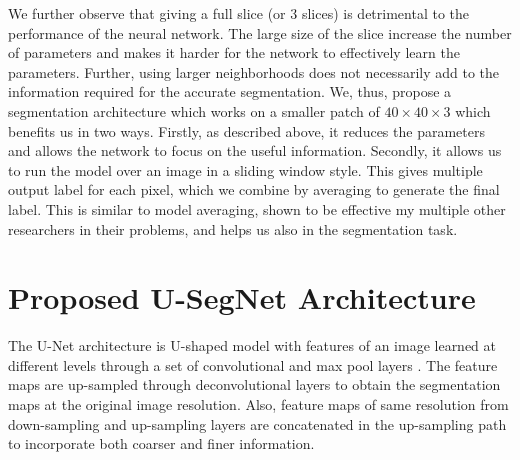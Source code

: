 \documentclass{article}
\begin{document}
We further observe that giving a full slice (or 3 slices) is detrimental to the performance of the neural network. The large size of the slice increase the number of parameters and makes it harder for the network to effectively learn the parameters. Further, using larger neighborhoods does not necessarily add to the information required for the accurate segmentation. We, thus, propose a segmentation architecture which works on a smaller patch of $40 \times 40 \times 3$ which benefits us in two ways. Firstly, as described above, it reduces the parameters and allows the network to focus on the useful information. Secondly, it allows us to run the model over an image in a sliding window style. This gives multiple output label for each pixel, which we combine by averaging to generate the final label. This is similar to model averaging, shown to be effective my multiple other researchers in their problems, and helps us also in the segmentation task.



\section{Proposed U-SegNet Architecture}

The U-Net architecture is U-shaped model with features of an image learned at different levels through a set of convolutional and max pool layers \cite{u-net}. The feature maps are up-sampled through deconvolutional layers to obtain the segmentation maps at the original image resolution. Also, feature maps of same resolution from down-sampling and up-sampling layers are concatenated in the up-sampling path to incorporate both coarser and finer information.
\end{document}
